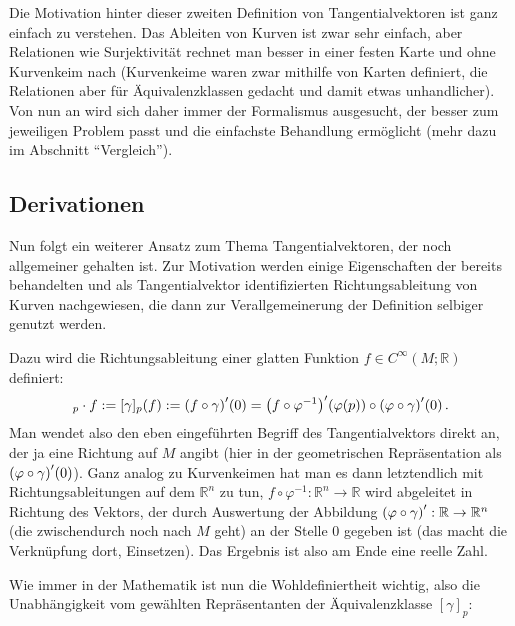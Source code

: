 \documentclass[../H_Analysis_main.tex]{subfiles}
\begin{document}
Die Motivation hinter dieser zweiten Definition von Tangentialvektoren ist ganz einfach zu verstehen. Das Ableiten von Kurven ist zwar sehr einfach, aber Relationen wie Surjektivität rechnet man besser in einer festen Karte und ohne Kurvenkeim nach (Kurvenkeime waren zwar mithilfe von Karten definiert, die Relationen aber für Äquivalenzklassen gedacht und damit etwas unhandlicher). Von nun an wird sich daher immer der Formalismus ausgesucht, der besser zum jeweiligen Problem passt und die einfachste Behandlung ermöglicht (mehr dazu im Abschnitt \enquote{Vergleich}).



		\subsection{Derivationen}
Nun folgt ein weiterer Ansatz zum Thema Tangentialvektoren, der noch allgemeiner gehalten ist. Zur Motivation werden einige Eigenschaften der bereits behandelten und als Tangentialvektor identifizierten Richtungsableitung von Kurven nachgewiesen, die dann zur Verallgemeinerung der Definition selbiger genutzt werden.

Dazu wird die Richtungsableitung einer glatten Funktion $f \in C^\infty(M; \mathbb{R})$ definiert:
\begin{equation}
[\gamma]_p \cdot f := [\gamma]_p(f) := \qty(f \circ \gamma)'(0) = \qty(f \circ \varphi^{-1})'\qty(\varphi(p)) \circ \qty(\varphi \circ \gamma)'(0) \, .
\end{equation}
Man wendet also den eben eingeführten Begriff des Tangentialvektors direkt an, der ja eine Richtung auf $M$ angibt (hier in der geometrischen Repräsentation als $\qty(\varphi \circ \gamma)'(0)$). Ganz analog zu Kurvenkeimen hat man es dann letztendlich mit Richtungsableitungen auf dem $\mathbb{R}^n$ zu tun, $f \circ \varphi^{-1}: \mathbb{R}^n \rightarrow \mathbb{R}$ wird abgeleitet in Richtung des Vektors, der durch Auswertung der Abbildung $\qty(\varphi \circ \gamma)': \mathbb{R} \rightarrow \mathbb{R}^n$ (die zwischendurch noch nach $M$ geht) an der Stelle 0 gegeben ist (das macht die Verknüpfung dort, Einsetzen). Das Ergebnis ist also am Ende eine reelle Zahl.


Wie immer in der Mathematik ist nun die Wohldefiniertheit wichtig, also die Unabhängigkeit vom gewählten Repräsentanten der Äquivalenzklasse $[\gamma]_p$:
\end{document}
